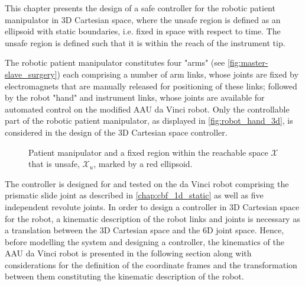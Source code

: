 This chapter presents the design of a safe controller for the  robotic patient manipulator in 3D Cartesian space, where the unsafe region is defined as an ellipsoid with static boundaries, i.e. fixed in space with respect to time. The unsafe region is defined such that it is within the reach of the instrument tip. 

The robotic patient manipulator constitutes four "arms" (see \autoref{fig:master-slave_surgery}) each comprising a number of arm links, whose joints are fixed by electromagnets that are manually released for positioning of these links; followed by the robot "hand" and instrument links, whose joints are available for automated control on the modified AAU da Vinci robot. Only the controllable part of the robotic patient manipulator, as displayed in \autoref{fig:robot_hand_3d}, is considered in the design of the 3D Cartesian space controller. 

\begin{figure}[htbp]
\centering
{}%
	\hspace*{5mm}
%
\caption{Patient manipulator and a fixed region within the reachable space $\mathcal{X}$ that is unsafe, $\mathcal{X}_u$, marked by a red ellipsoid.}
\label{fig:robot_hand_3d}
\end{figure}

The controller is designed for and tested on the da Vinci robot comprising the prismatic slide joint as described in \autoref{chap:cbf_1d_static} as well as five independent revolute joints. In order to design a controller in 3D Cartesian space for the robot, a kinematic description of the robot links and joints is necessary as a translation between the 3D Cartesian space and the 6D joint space.
Hence, before modelling the system and designing a controller, the kinematics of the AAU da Vinci robot is presented in the following section along with considerations for the definition of the coordinate frames and the transformation between them constituting the kinematic description of the robot.


